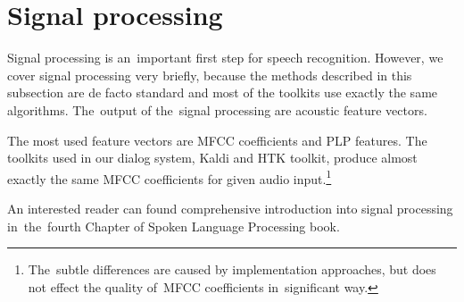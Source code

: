 
\section{Signal processing}
\label{sub:signal}
Signal processing is an~important first step for speech recognition. However, we cover signal processing very briefly, 
because the methods described in this subsection are de facto standard and most of the toolkits use exactly the same 
algorithms. The~output of the~signal processing are acoustic feature vectors. 


The most used feature vectors are \ac{MFCC} coefficients and \ac{PLP} features. The toolkits used in our dialog system, 
Kaldi and \ac{HTK} toolkit, produce almost exactly the same \ac{MFCC} coefficients for given audio 
input.\footnote{The~subtle differences are caused by implementation approaches, but does not effect the quality 
    of~\ac{MFCC} coefficients in~significant way.}

An interested reader can found comprehensive introduction into signal processing 
in~the~fourth Chapter of Spoken Language Processing book\cite{huang2001spoken}.



